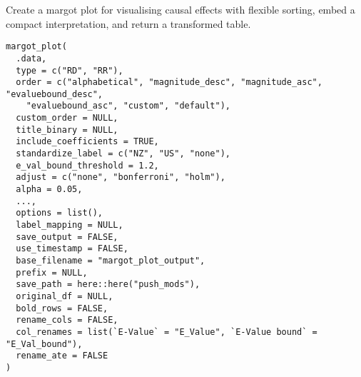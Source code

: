 \documentclass[a4paper]{book}
\begin{document}
\begin{Description}
Create a margot plot for visualising causal effects with flexible sorting,
embed a compact interpretation, and return a transformed table.
\end{Description}
%
\begin{Usage}
\begin{verbatim}
margot_plot(
  .data,
  type = c("RD", "RR"),
  order = c("alphabetical", "magnitude_desc", "magnitude_asc", "evaluebound_desc",
    "evaluebound_asc", "custom", "default"),
  custom_order = NULL,
  title_binary = NULL,
  include_coefficients = TRUE,
  standardize_label = c("NZ", "US", "none"),
  e_val_bound_threshold = 1.2,
  adjust = c("none", "bonferroni", "holm"),
  alpha = 0.05,
  ...,
  options = list(),
  label_mapping = NULL,
  save_output = FALSE,
  use_timestamp = FALSE,
  base_filename = "margot_plot_output",
  prefix = NULL,
  save_path = here::here("push_mods"),
  original_df = NULL,
  bold_rows = FALSE,
  rename_cols = FALSE,
  col_renames = list(`E-Value` = "E_Value", `E-Value bound` = "E_Val_bound"),
  rename_ate = FALSE
)
\end{verbatim}
\end{Usage}
%
\end{document}

